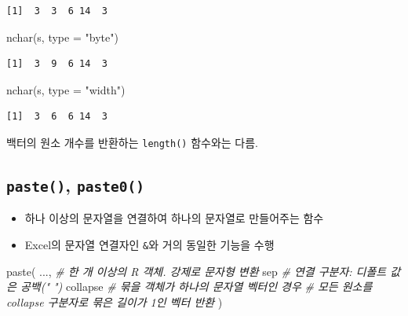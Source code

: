 \documentclass[
  11pt,
]{krantz}
\makeatletter
\newenvironment{Shaded}{\begin{snugshade}}{\end{snugshade}}
\newcommand{\AttributeTok}[1]{\textcolor[rgb]{0.61,0.61,0.61}{#1}}
\newcommand{\CommentTok}[1]{\textcolor[rgb]{0.37,0.37,0.37}{\textit{#1}}}
\newcommand{\FunctionTok}[1]{\textcolor[rgb]{0,0,0}{#1}}
\newcommand{\NormalTok}[1]{#1}
\newcommand{\StringTok}[1]{\textcolor[rgb]{0.5,0.5,0.5}{#1}}
\providecommand{\tightlist}{%
  \setlength{\itemsep}{0pt}\setlength{\parskip}{0pt}}
\newenvironment{kframe}{%
\medskip{}
\setlength{\fboxsep}{.8em}
 \def\at@end@of@kframe{}%
 \ifinner\ifhmode%
  \def\at@end@of@kframe{\end{minipage}}%
  \begin{minipage}{\columnwidth}%
 \fi\fi%
 \def\FrameCommand##1{\hskip\@totalleftmargin \hskip-\fboxsep
 \colorbox{shadecolor}{##1}\hskip-\fboxsep
     \hskip-\linewidth \hskip-\@totalleftmargin \hskip\columnwidth}%
 \MakeFramed {\advance\hsize-\width
   \@totalleftmargin\z@ \linewidth\hsize
   \@setminipage}}%
 {\par\unskip\endMakeFramed%
 \at@end@of@kframe}
\newenvironment{rmdblock}[1]
  {
  \begin{itemize}
  \renewcommand{\labelitemi}{
    \raisebox{-.7\height}[0pt][0pt]{
      {\setkeys{Gin}{width=3em,keepaspectratio}\texttt{[image: images/\#1]}}
    }
  }
  \setlength{\fboxsep}{1em}
  \begin{kframe}
  \item
  }
  {
  \end{kframe}
  \end{itemize}
  }
\newenvironment{rmdwarning}
  {\begin{rmdblock}{warning}}
  {\end{rmdblock}}
\makeatother
\begin{document}
\begin{verbatim}
[1]  3  3  6 14  3
\end{verbatim}

\begin{Shaded}
\begin{Highlighting}[]
\FunctionTok{nchar}\NormalTok{(s, }\AttributeTok{type =} \StringTok{"byte"}\NormalTok{)}
\end{Highlighting}
\end{Shaded}

\begin{verbatim}
[1]  3  9  6 14  3
\end{verbatim}

\begin{Shaded}
\begin{Highlighting}[]
\FunctionTok{nchar}\NormalTok{(s, }\AttributeTok{type =} \StringTok{"width"}\NormalTok{)}
\end{Highlighting}
\end{Shaded}

\begin{verbatim}
[1]  3  6  6 14  3
\end{verbatim}

\normalsize

\footnotesize

\begin{rmdwarning}
백터의 원소 개수를 반환하는 \texttt{length()} 함수와는 다름.
\end{rmdwarning}

\normalsize

\hypertarget{paste}{%
\subsection{\texorpdfstring{\textbf{\texttt{paste()}}, \textbf{\texttt{paste0()}}}{paste(), paste0()}}\label{paste}}

\begin{itemize}
\tightlist
\item
  하나 이상의 문자열을 연결하여 하나의 문자열로 만들어주는 함수
\item
  Excel의 문자열 연결자인 \texttt{\&}와 거의 동일한 기능을 수행
\end{itemize}

\footnotesize

\begin{Shaded}
\begin{Highlighting}[]
\FunctionTok{paste}\NormalTok{(}
\NormalTok{  ..., }\CommentTok{\# 한 개 이상의 R 객체. 강제로 문자형 변환}
\NormalTok{  sep  }\CommentTok{\# 연결 구분자: 디폴트 값은 공백(" ")}
\NormalTok{  collapse }\CommentTok{\# 묶을 객체가 하나의 문자열 벡터인 경우}
           \CommentTok{\# 모든 원소를 collapse 구분자로 묶은 길이가 1인 벡터 반환}
\NormalTok{)}
\end{Highlighting}
\end{Shaded}
\end{document}
